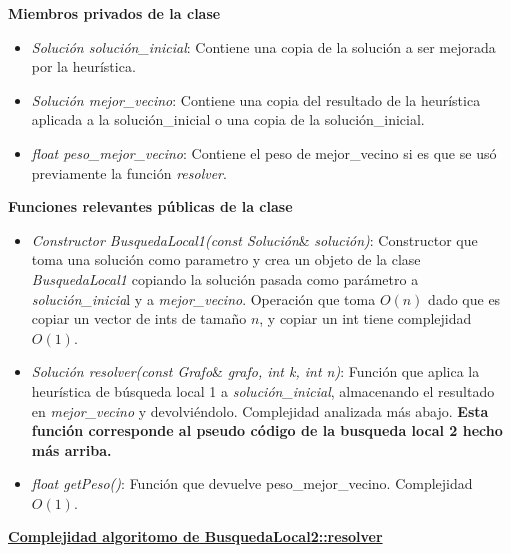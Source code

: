 \documentclass[10pt,a4paper]{article}
\begin{document}
\textbf{Miembros privados de la clase}
\begin{itemize}
\item \textit{Solución solución\_inicial}: Contiene una copia de la solución a ser mejorada por la heurística.
\item \textit{Solución mejor\_vecino}: Contiene una copia del resultado de la heurística aplicada a la solución\_inicial o una copia de la solución\_inicial.
\item \textit{float peso\_mejor\_vecino}: Contiene el peso de mejor\_vecino si es que se usó previamente la función \textit{resolver}.
\end{itemize}
\textbf{Funciones relevantes públicas de la clase}
\begin{itemize}
\item \textit{Constructor BusquedaLocal1(const Solución}\& \textit{solución)}: Constructor que toma una solución como parametro y crea un objeto de la clase \textit{BusquedaLocal1} copiando la solución pasada como parámetro a \textit{solución\_inicia}l y a \textit{mejor\_vecino}. Operación que toma $O(n)$ dado que es copiar un vector de ints de tamaño $n$, y copiar un int tiene complejidad $O(1)$.
\item \textit{Solución resolver(const Grafo}\& \textit{grafo, int k, int n)}: Función que aplica la heurística de búsqueda local 1 a \textit{solución\_inicial}, almacenando el resultado en \textit{mejor\_vecino} y devolviéndolo. Complejidad analizada más abajo. \textbf{Esta función corresponde al pseudo código de la busqueda local 2 hecho más arriba.}
\item \textit{float getPeso()}: Función que devuelve peso\_mejor\_vecino. Complejidad $O(1)$.
\end{itemize}

\noindent \textbf{\underline{Complejidad algoritomo de BusquedaLocal2::resolver}}
\end{document}
